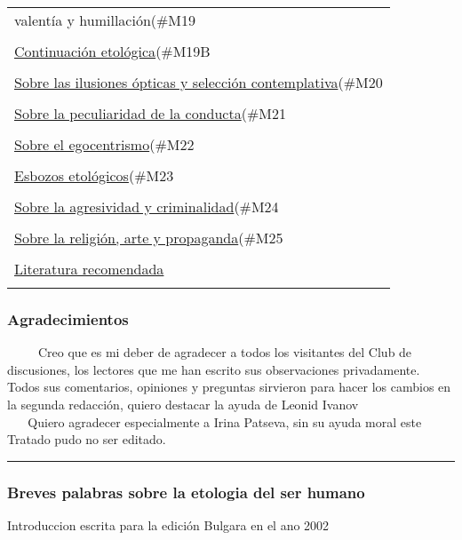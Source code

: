 \begin{longtable}[]{@{}l@{}}
{valentía y humillación}(\#M19\tabularnewline
\tabularnewline
\protect\hyperlink{continuaciuxf3n-etoluxf3gica}{Continuación
etológica}(\#M19B\tabularnewline
\tabularnewline
\protect\hyperlink{sobre-las-ilusiones-uxf3pticas-y-selecciuxf3n-contemplativa}{Sobre
las ilusiones ópticas y selección contemplativa}(\#M20\tabularnewline
\tabularnewline
\protect\hyperlink{sobre-la-peculiaridad-de-la-conducta}{Sobre la
peculiaridad de la conducta}(\#M21\tabularnewline
\tabularnewline
\protect\hyperlink{sobre-el-egocentrismo}{Sobre el
egocentrismo}(\#M22\tabularnewline
\tabularnewline
\protect\hyperlink{esbozos-etoluxf3gicos}{Esbozos
etológicos}(\#M23\tabularnewline
\tabularnewline
\protect\hyperlink{sobre-la-agresividad-y-criminalidad}{Sobre la
agresividad y criminalidad}(\#M24\tabularnewline
\tabularnewline
\protect\hyperlink{sobre-la-religiuxf3n-arte-y-propaganda}{Sobre la
religión, arte y propaganda}(\#M25\tabularnewline
\tabularnewline
\protect\hyperlink{M26}{Literatura recomendada}\tabularnewline
\tabularnewline
\bottomrule
\end{longtable}

\subsubsection{Agradecimientos}\label{agradecimientos}

~ ~ ~ Creo que es mi deber de agradecer a todos los visitantes del Club
de discusiones, los lectores que me han escrito sus observaciones
privadamente. Todos sus comentarios, opiniones y preguntas sirvieron
para hacer los cambios en la segunda redacción, quiero destacar la ayuda
de Leonid Ivanov\\
\hspace*{0.333em} ~ ~ Quiero agradecer especialmente a Irina Patseva,
sin su ayuda moral este Tratado pudo no ser editado.

\begin{center}\rule{0.5\linewidth}{\linethickness}\end{center}

\protect\hypertarget{M02}{}{}

\subsubsection{Breves palabras sobre la etologia del ser
humano}\label{breves-palabras-sobre-la-etologia-del-ser-humano}

Introduccion escrita para la edición Bulgara en el ano 2002

